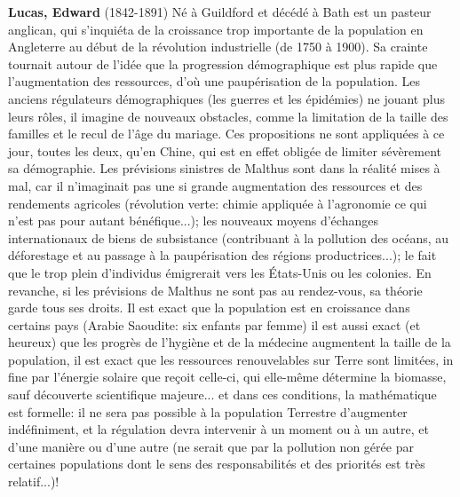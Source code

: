 \textbf{Lucas, Edward} (1842-1891) Né à Guildford et décédé à Bath est un pasteur anglican, qui s'inquiéta de la croissance trop importante de la population en Angleterre au début de la révolution industrielle (de 1750 à 1900). Sa crainte tournait autour de l'idée que la progression démographique est plus rapide que l'augmentation des ressources, d'où une paupérisation de la population. Les anciens régulateurs démographiques (les guerres et les épidémies) ne jouant plus leurs rôles, il imagine de nouveaux obstacles, comme la limitation de la taille des familles et le recul de l'âge du mariage. Ces propositions ne sont appliquées à ce jour, toutes les deux, qu'en Chine, qui est en effet obligée de limiter sévèrement sa démographie. Les prévisions sinistres de Malthus sont dans la réalité mises à mal, car il n'imaginait pas une si grande augmentation des ressources et des rendements agricoles (révolution verte: chimie appliquée à l'agronomie ce qui n'est pas pour autant bénéfique...); les nouveaux moyens d'échanges internationaux de biens de subsistance (contribuant à la pollution des océans, au déforestage et au passage à la paupérisation des régions productrices...); le fait que le trop plein d'individus émigrerait vers les États-Unis ou les colonies. En revanche, si les prévisions de Malthus ne sont pas au rendez-vous, sa théorie garde tous ses droits. Il est exact que la population est en croissance dans certains pays (Arabie Saoudite: six enfants par femme) il est aussi exact (et heureux) que les progrès de l'hygiène et de la médecine augmentent la taille de la population, il est exact que les ressources renouvelables sur Terre sont limitées, in fine par l'énergie solaire que reçoit celle-ci, qui elle-même détermine la biomasse, sauf découverte scientifique majeure... et dans ces conditions, la mathématique est formelle: il ne sera pas possible à la population Terrestre d'augmenter indéfiniment, et la régulation devra intervenir à un moment ou à un autre, et d'une manière ou d'une autre (ne serait que par la pollution non gérée par certaines populations dont le sens des responsabilités et des priorités est très relatif...)!

{}
\label{sec:M}


